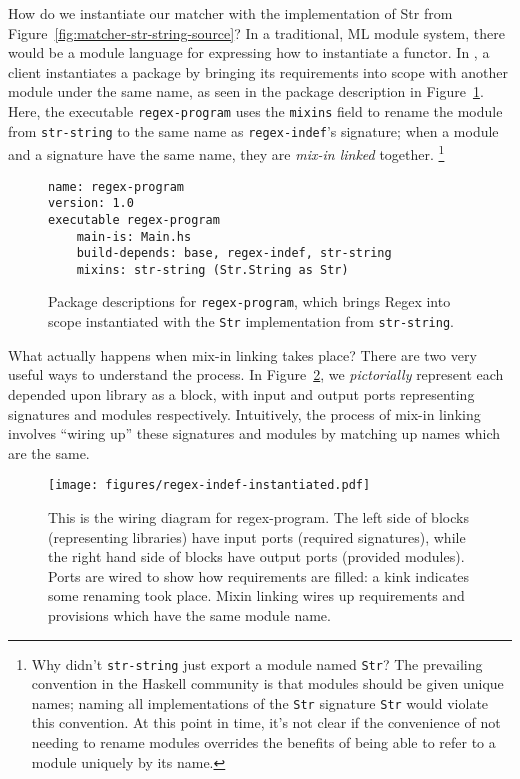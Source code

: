 How do we instantiate our matcher with the
implementation of Str from Figure~\ref{fig:matcher-str-string-source}?
In a traditional, ML module system, there would be a module language for
expressing how to instantiate a functor.
In \Backpack{}, a client instantiates a package by bringing its
requirements into scope with another module under the same name,
as seen in the package description in Figure~\ref{fig:matcher-functorized-packages}.  Here, the executable \verb|regex-program| uses the
\verb|mixins| field to rename the module from \verb|str-string| to the
same name as \verb|regex-indef|'s signature; when a module and
a signature have the same name, they are \emph{mix-in linked} together.%
%
\footnote{Why didn't \texttt{str-string} just export
a module named \texttt{Str}?  The prevailing convention in the Haskell
community is that modules should be given unique names; naming all
implementations of the \texttt{Str} signature \texttt{Str} would violate
this convention.  At this point in time, it's not clear if the
convenience of not needing to rename modules overrides the benefits of
being able to refer to a module uniquely by its name.}

\begin{figure}
\begin{lstlisting}[language=Cabal]
name: regex-program
version: 1.0
executable regex-program
    main-is: Main.hs
    build-depends: base, regex-indef, str-string
    mixins: str-string (Str.String as Str)
\end{lstlisting}
\caption{Package descriptions for \texttt{regex-program}, which brings
Regex into scope instantiated with the \texttt{Str} implementation from \texttt{str-string}.}
\label{fig:matcher-functorized-packages}
\end{figure}

What actually happens when mix-in linking takes place?  There are two very useful
ways to understand the process.  In Figure~\ref{fig:regex-indef-instantiated}, we
\emph{pictorially} represent each depended upon library as a block, with input and output
ports representing signatures and modules respectively.  Intuitively, the process
of mix-in linking involves ``wiring up'' these signatures and modules by matching
up names which are the same.

\begin{figure}
\center%
\texttt{[image: figures/regex-indef-instantiated.pdf]}
\caption{This is the wiring diagram for regex-program. The left side of blocks
(representing libraries) have input ports (required signatures), while the right hand side
of blocks have output ports (provided modules). Ports are wired to show how requirements are
filled: a kink indicates some renaming took place. Mixin linking wires up requirements
and provisions which have the same module name.}
\label{fig:regex-indef-instantiated}
\end{figure}

